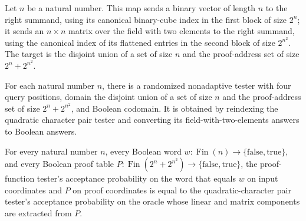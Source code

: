 \begin{definition}
\label{FABL.quadraticPairProofAddress}
\leanok
{}
Let $n$ be a natural number. This map sends a binary vector of length $n$ to the right
summand, using its canonical binary-cube index in the first block of size $2^n$; it
sends an $n\times n$ matrix over the field with two elements to the right summand, using
the canonical index of its flattened entries in the second block of size $2^{n^2}$. The
target is the disjoint union of a set of size $n$ and the proof-address set of size
$2^n+2^{n^2}$.
\end{definition}

\begin{definition}
\label{FABL.quadraticPairProofFunctionTester}
\leanok
{}
For each natural number $n$, there is a randomized nonadaptive tester with four query
positions, domain the disjoint union of a set of size $n$ and the proof-address set of
size $2^n+2^{n^2}$, and Boolean codomain. It is obtained by reindexing the quadratic
character pair tester and converting its field-with-two-elements answers to Boolean
answers.
\end{definition}

\begin{theorem}
\label{FABL.quadraticPairProofFunctionTester_acceptanceProbability}
\leanok
{}
For every natural number $n$, every Boolean word
$w\colon\operatorname{Fin}(n)\to\{\mathrm{false},\mathrm{true}\}$, and every Boolean
proof table $P\colon\operatorname{Fin}(2^n+2^{n^2})\to\{\mathrm{false},\mathrm{true}\}$,
the proof-function tester's acceptance probability on the word that equals $w$ on input
coordinates and $P$ on proof coordinates is equal to the quadratic-character pair
tester's acceptance probability on the oracle whose linear and matrix components are
extracted from $P$.
\end{theorem}

